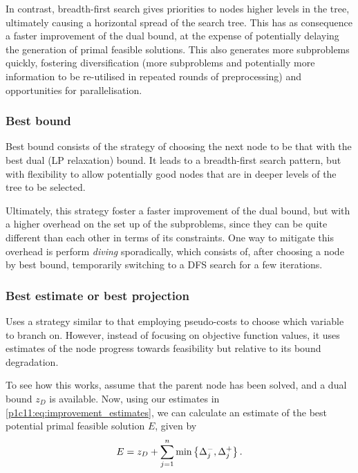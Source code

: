 In contrast, breadth-first search gives priorities to nodes higher levels in the tree, ultimately causing a horizontal spread of the search tree. This has as consequence a faster improvement of the dual bound, at the expense of potentially delaying the generation of primal feasible solutions. This also generates more subproblems quickly, fostering diversification (more subproblems and potentially more information to be re-utilised in repeated rounds of preprocessing) and opportunities for parallelisation. 


\subsubsection{Best bound}

Best bound consists of the strategy of choosing the next node to be that with the best dual (LP relaxation) bound. It leads to a breadth-first search pattern, but with flexibility to allow potentially good nodes that are in deeper levels of the tree to be selected. 

Ultimately, this strategy foster a faster improvement of the dual bound, but with a higher overhead on the set up of the subproblems, since they can be quite different than each other in terms of its constraints. One way to mitigate this overhead is perform \emph{diving} sporadically, which consists of, after choosing a node by best bound, temporarily switching to a DFS search for a few iterations.


\subsubsection{Best estimate or best projection}

Uses a strategy similar to that employing pseudo-costs to choose which variable to branch on. However, instead of focusing on objective function values, it uses estimates of the node progress towards feasibility but relative to its bound degradation. 

To see how this works, assume that the parent node has been solved, and a dual bound $z_D$ is available. Now, using our estimates in \eqref{p1c11:eq:improvement_estimates}, we can calculate an estimate of the best potential primal feasible solution $E$, given by
%
\begin{equation*}
	E = z_D + \sum_{j = 1}^n \min\left\{ \Delta^-_j, \Delta^+_j \right \}.	
\end{equation*}
%


